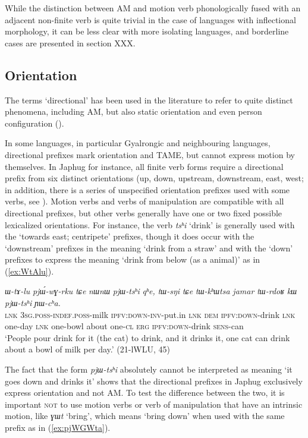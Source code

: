 \documentclass[oneside,a4paper,11pt]{article}
\newcommand{\ipa}[1]{{\phon\textit{#1}}}
\begin{document}
While the distinction between AM and motion verb phonologically fused with an adjacent non-finite verb is quite trivial in the case of languages with inflectional morphology, it can be less clear with more isolating languages, and borderline cases are presented in section XXX.

\subsection{Orientation}
The terms `directional' has been used in the literature to refer to quite distinct phenomena, including AM, but also static orientation and even person configuration (\citealt[20]{zuniga06}). 

In some languages, in particular Gyalrongic and neighbouring languages, directional prefixes mark orientation  and TAME, but cannot express motion by themselves. In Japhug for instance, all finite verb forms require a directional prefix from six distinct orientations (up, down, upstream, downstream, east, west; in addition, there is a series of unspecified orientation prefixes used with some verbs, see \citealt{jacques17sketch}). Motion verbs and verbs of manipulation are compatible with all directional prefixes, but other verbs generally have one or two fixed possible lexicalized orientations. For instance, the verb \ipa{tsʰi} `drink' is generally used with the `towards east; centripete' prefixes, though it does occur with the `downstream' prefixes in the meaning `drink from a straw' and with the `down' prefixes to express the meaning `drink from below (as a animal)' as in (\ref{ex:WtAlu}). 

  \begin{exe}
\ex \label{ex:WtAlu}
 \gll \ipa{tɕe} 	\ipa{ɯ-tɤ-lu} 	\ipa{pjɯ́-wɣ-rku} 	\ipa{tɕe} 	\ipa{nɯnɯ} 	\ipa{pjɯ-tsʰi} 	\ipa{qʰe,} 	\ipa{tɯ-sŋi} 	\ipa{tɕe} 	\ipa{tɯ-kʰɯtsa} 	\ipa{jamar} 	\ipa{tɯ-rdoʁ} 	\ipa{kɯ} 	\ipa{pjɯ-tsʰi} 	\ipa{ɲɯ-cʰa.}  \\
\textsc{lnk} \textsc{3sg.poss}-\textsc{indef.poss}-milk \textsc{ipfv}:\textsc{down}-\textsc{inv}-put.in  \textsc{lnk} \textsc{dem} \textsc{ipfv}:\textsc{down}-drink \textsc{lnk} one-day \textsc{lnk} one-bowl about one-\textsc{cl} \textsc{erg} \textsc{ipfv}:\textsc{down}-drink \textsc{sens}-can \\
\glt `People pour drink for it (the cat) to drink, and it drinks it, one cat can drink about a bowl of milk per day.' (21-lWLU, 45)
  \end{exe}

The fact that the form \ipa{pjɯ-tsʰi} absolutely cannot be interpreted as meaning `it goes down and drinks it' shows that the directional prefixes in Japhug exclusively express orientation and not AM. To test the difference between the two, it is important \textsc{not} to use motion verbs or verb of manipulation that have an intrinsic motion, like  \ipa{ɣɯt} `bring', which means `bring down' when used with the same prefix as in (\ref{ex:pjWGWta}).
\end{document}

